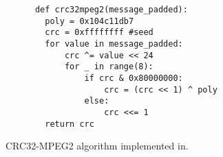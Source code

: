 \begin{listing}[H]
    \begin{verbatim}
      def crc32mpeg2(message_padded):
        poly = 0x104c11db7
        crc = 0xffffffff #seed
        for value in message_padded:
            crc ^= value << 24
            for _ in range(8):
                if crc & 0x80000000:
                    crc = (crc << 1) ^ poly
                else:
                    crc <<= 1
        return crc
    \end{verbatim}
    \caption{CRC32-MPEG2 algorithm implemented in.}
\end{listing}